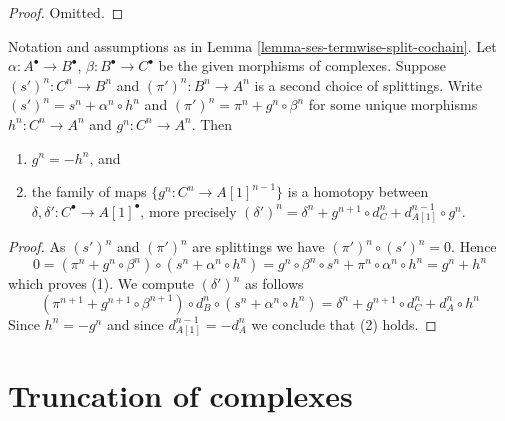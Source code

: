 \begin{proof}
Omitted.
\end{proof}

\begin{lemma}
\label{lemma-ses-termwise-split-homotopy-cochain}
Notation and assumptions as in
Lemma \ref{lemma-ses-termwise-split-cochain}.
Let $\alpha : A^\bullet \to B^\bullet$,
$\beta : B^\bullet \to C^\bullet$ be the given
morphisms of complexes.
Suppose $(s')^n : C^n \to B^n$ and $(\pi')^n : B^n \to A^n$
is a second choice of splittings.
Write $(s')^n = s^n + \alpha^n \circ h^n$ and
$(\pi')^n = \pi^n + g^n \circ \beta^n$ for some unique
morphisms $h^n : C^n \to A^n$ and $g^n : C^n \to A^n$. Then
\begin{enumerate}
\item $g^n = - h^n$, and
\item the family of maps $\{g^n : C^n \to A[1]^{n - 1}\}$ is a homotopy
between $\delta, \delta' : C^\bullet \to A[1]^\bullet$, more precisely
$(\delta')^n = \delta^n + g^{n + 1} \circ d_C^n + d_{A[1]}^{n - 1} \circ g^n$.
\end{enumerate}
\end{lemma}

\begin{proof}
As $(s')^n$ and $(\pi')^n$ are splittings we have $(\pi')^n \circ (s')^n = 0$.
Hence
$$
0 = ( \pi^n + g^n \circ \beta^n ) \circ ( s^n + \alpha^n \circ h^n ) =
g^n \circ \beta^n \circ s^n + \pi^n \circ \alpha^n \circ h^n =
g^n + h^n
$$
which proves (1). We compute $(\delta')^n$ as follows
$$
( \pi^{n + 1} + g^{n + 1} \circ \beta^{n + 1} )
\circ d_B^n \circ
( s^n + \alpha^n \circ h^n )
= \delta^n + g^{n + 1} \circ d_C^n + d_A^n \circ h^n
$$
Since $h^n = -g^n$ and since $d_{A[1]}^{n - 1} = -d_A^n$ we conclude that (2)
holds.
\end{proof}




\section{Truncation of complexes}
\label{section-truncations}


